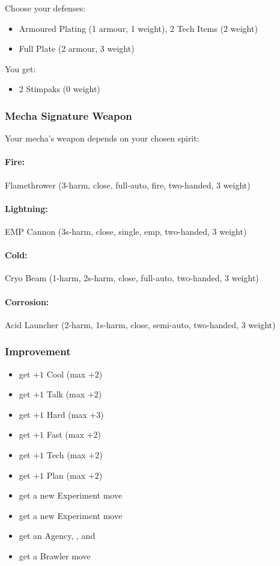 Choose your defenses:
\begin{itemize}
\item Armoured Plating (1 armour, 1 weight), 2 Tech Items (2 weight)
\item Full Plate (2 armour, 3 weight)
\end{itemize}

You get:
\begin{itemize}
\item 2 Stimpaks (0 weight)
\end{itemize}

\subsubsection{Mecha Signature Weapon}
Your mecha's weapon depends on your chosen spirit:
\paragraph{Fire:} Flamethrower (3-harm, close, full-auto, fire, two-handed, 3 weight)
\paragraph{Lightning:} EMP Cannon (3s-harm, close, single, emp, two-handed, 3 weight)
\paragraph{Cold:} Cryo Beam (1-harm, 2s-harm, close, full-auto, two-handed, 3 weight)
\paragraph{Corrosion:} Acid Launcher (2-harm, 1s-harm, close, semi-auto, two-handed, 3 weight)

\subsubsection{Improvement}
\begin{itemize}
\item get $+1$ Cool (max $+2$)
\item get $+1$ Talk (max $+2$)
\item get $+1$ Hard (max $+3$)
\item get $+1$ Fast (max $+2$)
\item get $+1$ Tech (max $+2$)
\item get $+1$ Plan (max $+2$)
\item get a new Experiment move
\item get a new Experiment move
\item get an Agency, , and 
\item get a Brawler move
\end{itemize}